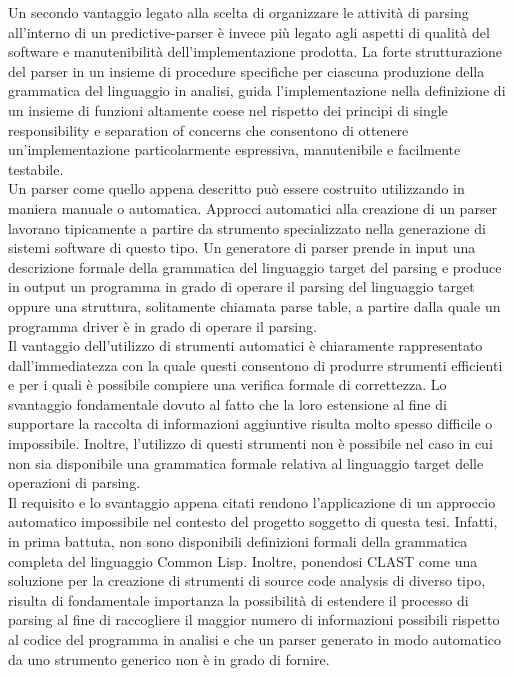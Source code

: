 Un secondo vantaggio legato alla scelta di organizzare le attività di parsing
all’interno di un predictive-parser è invece più legato agli aspetti di
qualità del software e manutenibilità dell’implementazione prodotta. La forte
strutturazione del parser in un insieme di procedure specifiche per ciascuna
produzione della grammatica del linguaggio in analisi, guida l’implementazione
nella definizione di un insieme di funzioni altamente coese nel rispetto dei
principi di single responsibility e separation of concerns che consentono di
ottenere un’implementazione particolarmente espressiva, manutenibile e
facilmente testabile.\\

Un parser come quello appena descritto può essere costruito utilizzando in
maniera manuale o automatica. Approcci automatici alla creazione di un parser
lavorano tipicamente a partire da strumento specializzato nella generazione di
sistemi software di questo tipo. Un generatore di parser prende in input una
descrizione formale della grammatica del linguaggio target del parsing e
produce in output un programma in grado di operare il parsing del linguaggio
target oppure una struttura, solitamente chiamata parse table, a partire dalla
quale un programma driver è in grado di operare il parsing.\\

Il vantaggio dell’utilizzo di strumenti automatici è chiaramente rappresentato
dall’immediatezza con la quale questi consentono di produrre strumenti
efficienti e per i quali è possibile compiere una verifica formale di
correttezza. Lo svantaggio fondamentale dovuto al fatto che la loro estensione
al fine di supportare la raccolta di informazioni aggiuntive risulta molto
spesso difficile o impossibile. Inoltre, l’utilizzo di questi strumenti non è
possibile nel caso in cui non sia disponibile una grammatica formale relativa
al linguaggio target delle operazioni di parsing.\\

Il requisito e lo svantaggio appena citati rendono l’applicazione di un
approccio automatico impossibile nel contesto del progetto soggetto di questa
tesi. Infatti, in prima battuta, non sono disponibili definizioni formali
della grammatica completa del linguaggio Common Lisp. Inoltre, ponendosi CLAST
come una soluzione per la creazione di strumenti di source code analysis di
diverso tipo, risulta di fondamentale importanza la possibilità di estendere
il processo di parsing al fine di raccogliere il maggior numero di
informazioni possibili rispetto al codice del programma in analisi e che un
parser generato in modo automatico da uno strumento generico non è in grado di
fornire.\\

